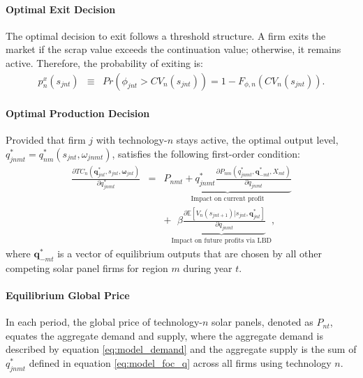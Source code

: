 \documentclass[12pt, letter]{article}
\begin{document}
\paragraph{Optimal Exit Decision}
The optimal decision to exit follows a threshold structure. A firm exits the market if the scrap value exceeds the continuation value; otherwise, it remains active. Therefore, the probability of exiting is:
\begin{eqnarray}
    p_n^x(s_{jnt}) & \equiv & Pr\!\left(\phi_{jnt} > CV_n(s_{jnt})\right) = 1-F_{\phi,n}\!\left(CV_n(s_{jnt})\right). \label{eq:exit_policy_fn}
\end{eqnarray}

\paragraph{Optimal Production Decision}
Provided that firm $j$ with technology-$n$ stays active, the optimal output level, $q_{jnmt}^*=q_{nm}^*(s_{jnt},\omega_{jnmt})$, satisfies the following first-order condition:
 \begin{eqnarray}
 \frac{\partial TC_{n}(\mathbf{q}_{jnt}^*,s_{jnt},\mathbf{\omega}_{jnt})}{\partial q_{jnmt}^*} & = & \underbrace{
    P_{nmt}+q_{jnmt}^*\frac{\partial P_{nm}(q^*_{jnmt}, \mathbf{q}^*_{-mt},X_{mt})}{\partial q_{jnmt}}}_{\text{Impact on current profit}} \nonumber \\
    && +  \underbrace{\beta \frac{\partial \mathbb{E}[V_n(s_{jnt+1})|s_{jnt}, \mathbf{q}_{jnt}^*] }{\partial q_{jnmt}} }_{\text{Impact on future profits via LBD}}, \label{eq:model_foc_q}
\end{eqnarray}  
where $\mathbf{q}^*_{-mt}$ is a vector of equilibrium outputs that are chosen by all other competing solar panel firms for region $m$ during year $t$.

\paragraph{Equilibrium Global Price}
In each period, the global price of technology-$n$ solar panels, denoted as $P_{nt}$, equates the aggregate demand and supply, where the aggregate demand is described by equation \eqref{eq:model_demand} and the aggregate supply is the sum of $q_{jnmt}^*$ defined in equation \eqref{eq:model_foc_q} across all firms using technology $n$.  
\end{document}
